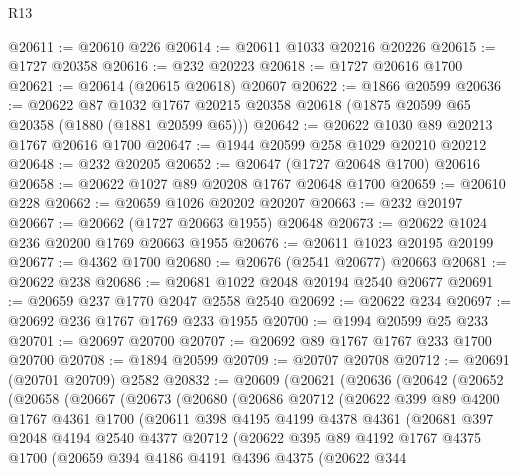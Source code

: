 \begin{lexlean}{R13}
\begin{coremodule}
@20611 := @20610 @226
@20614 := @20611 @1033 @20216 @20226
@20615 := @1727 @20358
@20616 := @232 @20223
@20618 := @1727 @20616 @1700
@20621 := @20614 (@20615 @20618) @20607
@20622 := @1866 @20599
@20636 := @20622
    @87
    @1032
    @1767
    @20215
    @20358
    @20618
    (@1875 @20599 @65 @20358 (@1880 (@1881 @20599 @65)))
@20642 := @20622 @1030 @89 @20213 @1767 @20616 @1700
@20647 := @1944 @20599 @258 @1029 @20210 @20212
@20648 := @232 @20205
@20652 := @20647 (@1727 @20648 @1700) @20616
@20658 := @20622 @1027 @89 @20208 @1767 @20648 @1700
@20659 := @20610 @228
@20662 := @20659 @1026 @20202 @20207
@20663 := @232 @20197
@20667 := @20662 (@1727 @20663 @1955) @20648
@20673 := @20622 @1024 @236 @20200 @1769 @20663 @1955
@20676 := @20611 @1023 @20195 @20199
@20677 := @4362 @1700
@20680 := @20676 (@2541 @20677) @20663
@20681 := @20622 @238
@20686 := @20681 @1022 @2048 @20194 @2540 @20677
@20691 := @20659 @237 @1770 @2047 @2558 @2540
@20692 := @20622 @234
@20697 := @20692 @236 @1767 @1769 @233 @1955
@20700 := @1994 @20599 @25 @233
@20701 := @20697 @20700
@20707 := @20692 @89 @1767 @1767 @233 @1700 @20700
@20708 := @1894 @20599
@20709 := @20707 @20708
@20712 := @20691 (@20701 @20709) @2582
@20832 := @20609
    (@20621
      (@20636
        (@20642
          (@20652
            (@20658
              (@20667
                (@20673
                  (@20680
                    (@20686
                      @20712
                      (@20622
                        @399
                        @89
                        @4200
                        @1767
                        @4361
                        @1700
                        (@20611
                          @398
                          @4195
                          @4199
                          @4378
                          @4361
                          (@20681
                            @397
                            @2048
                            @4194
                            @2540
                            @4377
                            @20712
                            (@20622
                              @395
                              @89
                              @4192
                              @1767
                              @4375
                              @1700
                              (@20659
                                @394
                                @4186
                                @4191
                                @4396
                                @4375
                                (@20622
                                  @344

\end{coremodule}
\end{lexlean}
